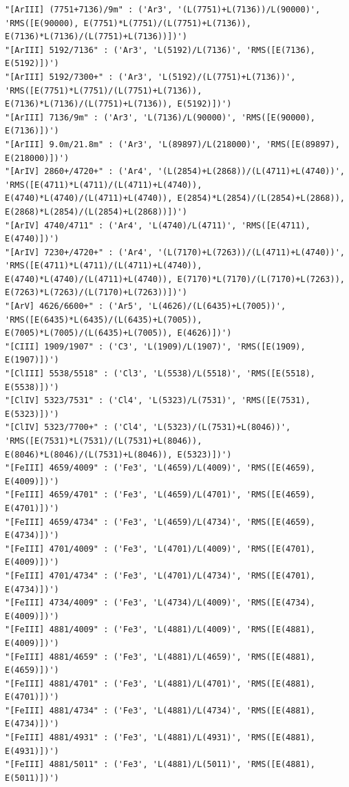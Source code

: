 \documentclass{report}
\begin{document}
    \begin{Verbatim}[commandchars=\\\{\}]
"[ArIII] (7751+7136)/9m" : ('Ar3', '(L(7751)+L(7136))/L(90000)', 'RMS([E(90000), E(7751)*L(7751)/(L(7751)+L(7136)), E(7136)*L(7136)/(L(7751)+L(7136))])')
"[ArIII] 5192/7136" : ('Ar3', 'L(5192)/L(7136)', 'RMS([E(7136), E(5192)])')
"[ArIII] 5192/7300+" : ('Ar3', 'L(5192)/(L(7751)+L(7136))', 'RMS([E(7751)*L(7751)/(L(7751)+L(7136)), E(7136)*L(7136)/(L(7751)+L(7136)), E(5192)])')
"[ArIII] 7136/9m" : ('Ar3', 'L(7136)/L(90000)', 'RMS([E(90000), E(7136)])')
"[ArIII] 9.0m/21.8m" : ('Ar3', 'L(89897)/L(218000)', 'RMS([E(89897), E(218000)])')
"[ArIV] 2860+/4720+" : ('Ar4', '(L(2854)+L(2868))/(L(4711)+L(4740))', 'RMS([E(4711)*L(4711)/(L(4711)+L(4740)), E(4740)*L(4740)/(L(4711)+L(4740)), E(2854)*L(2854)/(L(2854)+L(2868)), E(2868)*L(2854)/(L(2854)+L(2868))])')
"[ArIV] 4740/4711" : ('Ar4', 'L(4740)/L(4711)', 'RMS([E(4711), E(4740)])')
"[ArIV] 7230+/4720+" : ('Ar4', '(L(7170)+L(7263))/(L(4711)+L(4740))', 'RMS([E(4711)*L(4711)/(L(4711)+L(4740)), E(4740)*L(4740)/(L(4711)+L(4740)), E(7170)*L(7170)/(L(7170)+L(7263)), E(7263)*L(7263)/(L(7170)+L(7263))])')
"[ArV] 4626/6600+" : ('Ar5', 'L(4626)/(L(6435)+L(7005))', 'RMS([E(6435)*L(6435)/(L(6435)+L(7005)), E(7005)*L(7005)/(L(6435)+L(7005)), E(4626)])')
"[CIII] 1909/1907" : ('C3', 'L(1909)/L(1907)', 'RMS([E(1909), E(1907)])')
"[ClIII] 5538/5518" : ('Cl3', 'L(5538)/L(5518)', 'RMS([E(5518), E(5538)])')
"[ClIV] 5323/7531" : ('Cl4', 'L(5323)/L(7531)', 'RMS([E(7531), E(5323)])')
"[ClIV] 5323/7700+" : ('Cl4', 'L(5323)/(L(7531)+L(8046))', 'RMS([E(7531)*L(7531)/(L(7531)+L(8046)), E(8046)*L(8046)/(L(7531)+L(8046)), E(5323)])')
"[FeIII] 4659/4009" : ('Fe3', 'L(4659)/L(4009)', 'RMS([E(4659), E(4009)])')
"[FeIII] 4659/4701" : ('Fe3', 'L(4659)/L(4701)', 'RMS([E(4659), E(4701)])')
"[FeIII] 4659/4734" : ('Fe3', 'L(4659)/L(4734)', 'RMS([E(4659), E(4734)])')
"[FeIII] 4701/4009" : ('Fe3', 'L(4701)/L(4009)', 'RMS([E(4701), E(4009)])')
"[FeIII] 4701/4734" : ('Fe3', 'L(4701)/L(4734)', 'RMS([E(4701), E(4734)])')
"[FeIII] 4734/4009" : ('Fe3', 'L(4734)/L(4009)', 'RMS([E(4734), E(4009)])')
"[FeIII] 4881/4009" : ('Fe3', 'L(4881)/L(4009)', 'RMS([E(4881), E(4009)])')
"[FeIII] 4881/4659" : ('Fe3', 'L(4881)/L(4659)', 'RMS([E(4881), E(4659)])')
"[FeIII] 4881/4701" : ('Fe3', 'L(4881)/L(4701)', 'RMS([E(4881), E(4701)])')
"[FeIII] 4881/4734" : ('Fe3', 'L(4881)/L(4734)', 'RMS([E(4881), E(4734)])')
"[FeIII] 4881/4931" : ('Fe3', 'L(4881)/L(4931)', 'RMS([E(4881), E(4931)])')
"[FeIII] 4881/5011" : ('Fe3', 'L(4881)/L(5011)', 'RMS([E(4881), E(5011)])')

\end{Verbatim}
\end{document}
